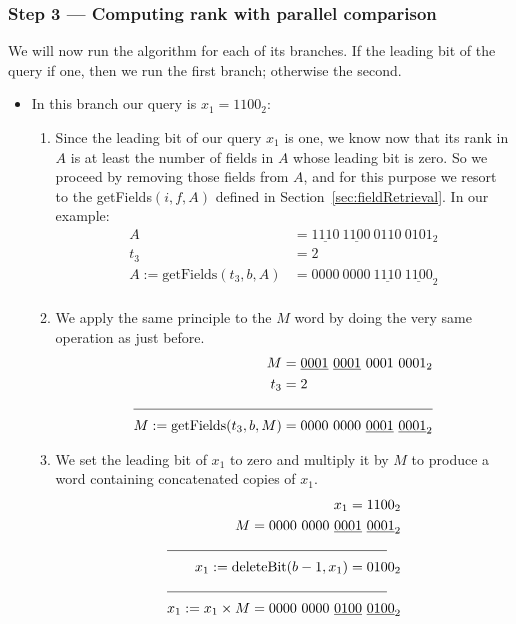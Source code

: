 \subsubsection{Step 3 --- Computing rank with parallel comparison}

We will now run the algorithm for each of its branches. If the leading bit of the query if one, then we run the first branch; otherwise the second.
\begin{itemize}
    \item
    In this branch our query is $x_1 = 1100_2$:
    \begin{enumerate}
        \item
        Since the leading bit of our query $x_1$ is one, we know now that its rank in $A$ is at least the number of fields in $A$ whose leading bit is zero. So we proceed by removing those fields from $A$, and for this purpose we resort to the getFields$(i, f, A)$ defined in Section~\ref{sec:fieldRetrieval}. In our example:
        \begin{align*}
            A &= \underline{1110}\ \underline{1100}\ 0110\ 0101_2 \\
            t_3 &= 2 \\
            A := \text{getFields}(t_3, b, A) &= 0000\ 0000\ \underline{1110}\ \underline{1100}_2 \\
        \end{align*}
        
        \item
        We apply the same principle to the $M$ word by doing the very same operation as just before.
        \begin{align*}
            M &= \underline{0001}\ \underline{0001}\ 0001\ 0001_2 \\
            t_3 &= 2 \\
            \cline{1-2}
            M := \text{getFields}(t_3, b, M) &= 0000\ 0000\ \underline{0001}\ \underline{0001}_2 \\
        \end{align*}
        
        \item
        We set the leading bit of $x_1$ to zero and multiply it by $M$ to produce a word containing concatenated copies of $x_1$.
        \begin{align*}
            x_1 = 1100_2 \\
            M = 0000\ 0000\ \underline{0001}\ \underline{0001}_2 \\
            \cline{1-2}
            x_1 := \text{deleteBit}(b - 1, x_1) = 0100_2 \\
            \cline{1-2}
            x_1 := x_1 \times M = 0000\ 0000\ \underline{0100}\ \underline{0100}_2 \\
        \end{align*}
        

\end{enumerate}
\end{itemize}

